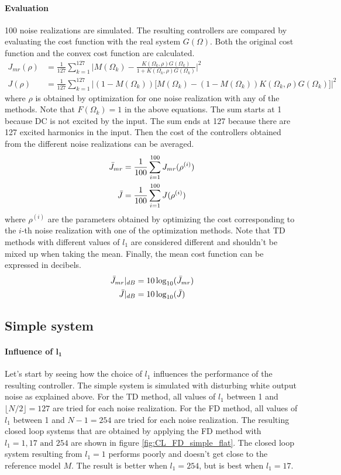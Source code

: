\paragraph{Evaluation}
100 noise realizations are simulated. The resulting controllers are compared by evaluating the cost function with the real system $G(\Omega)$. Both the original cost function and the convex cost function are calculated.
\begin{align*}
J_{mr}(\rho) &= \frac{1}{127} \sum_{k=1}^{127} \Big|M(\Omega_k) - \frac{K(\Omega_k,\rho)G(\Omega_k)}{1+K(\Omega_k,\rho)G(\Omega_k)}\Big|^2\\
J(\rho) &= \frac{1}{127} \sum_{k=1}^{127} \Big|(1-M(\Omega_k))\big[M(\Omega_k) - (1-M(\Omega_k))K(\Omega_k,\rho)G(\Omega_k)\big]\Big|^2
\end{align*}
where $\rho$ is obtained by optimization for one noise realization with any of the methods. Note that $F(\Omega_k)=1$ in the above equations. The sum starts at 1 because DC is not excited by the input. The sum ends at 127 because there are 127 excited harmonics in the input. Then the cost of the controllers obtained from the different noise realizations can be averaged.
\begin{align*}
\Bar{J}_{mr} &= \frac{1}{100} \sum_{i=1}^{100} J_{mr}(\rho^{(i)})\\
\Bar{J} &= \frac{1}{100} \sum_{i=1}^{100} J(\rho^{(i)})
\end{align*}
where $\rho^{(i)}$ are the parameters obtained by optimizing the cost corresponding to the \mbox{$i$-th} noise realization with one of the optimization methods. Note that TD methods with different values of $l_1$ are considered different and shouldn't be mixed up when taking the mean. Finally, the mean cost function can be expressed in decibels.
\begin{align*}
\Bar{J}_{mr}|_{dB} &= 10 \log_{10}(\Bar{J}_{mr}) \\
\Bar{J}|_{dB} &= 10 \log_{10}(\Bar{J})
\end{align*}

\newpage

\subsection{Simple system}
\paragraph{Influence of $\mathbf{l_1}$}
Let's start by seeing how the choice of $l_1$ influences the performance of the resulting controller. The simple system is simulated with disturbing white output noise as explained above. For the TD method, all values of $l_1$  between 1 and $\lfloor N/2 \rfloor = 127$ are tried for each noise realization. For the FD method, all values of $l_1$ between 1 and $N-1 = 254$ are tried for each noise realization. 
The resulting closed loop systems that are obtained by applying the FD method with $l_1 = 1,17  \text{ and } 254$ are shown in figure \ref{fig:CL_FD_simple_flat}. The closed loop system resulting from $l_1=1$ performs poorly and doesn't get close to the reference model $M$. The result is better when $l_1 = 254$, but is best when $l_1 = 17$.

